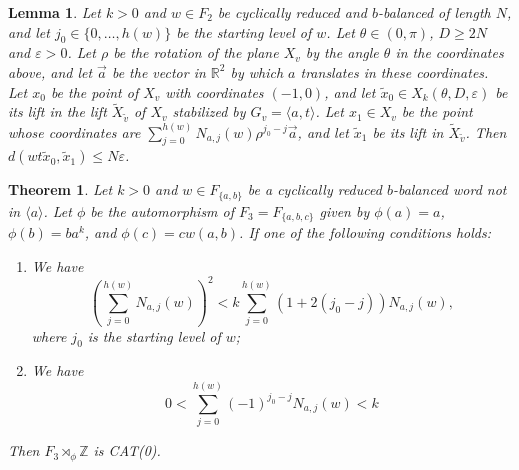 \documentclass[10pt,a4paper]{amsart}
\newtheorem{lem}{Lemma}
\newtheorem{thm}{Theorem}
\newcommand{\R}{\mathbb{R}}
\newcommand{\Z}{\mathbb{Z}}
\newcommand{\eps}{\varepsilon}
\begin{document}
\begin{lem}
\label{FlatkPos}
    Let $k > 0$ and $w\in F_2$ be cyclically reduced and $b$-balanced of length $N$, and let $j_0\in \{0, \ldots, h(w)\}$ be the starting level of $w$. Let $\theta\in (0, \pi)$, $D \ge 2N$ and $\eps > 0$. Let $\rho$ be the rotation of the plane $X_v$ by the angle $\theta$ in the coordinates above, and let $\vec{a}$ be the vector in $\R^2$ by which $a$ translates in these coordinates. Let $x_0$ be the point of $X_v$ with coordinates $(-1, 0)$, and let $\tilde{x}_0\in X_k(\theta, D, \eps)$ be its lift in the lift $\tilde{X}_{\tilde{v}}$ of $X_v$ stabilized by $G_v = \langle a, t\rangle$. Let $x_1\in X_v$ be the point whose coordinates are $\displaystyle \sum_{j=0}^{h(w)} N_{a,j}(w)\rho^{j_0-j}\vec{a}$, and let $\tilde{x}_1$ be its lift in $\tilde{X}_{\tilde{v}}$. Then $d(wt\tilde{x}_0, \tilde{x}_1) \le N\eps$.
\end{lem}

\begin{thm}
\label{CAT0ex}
    Let $k > 0$ and $w\in F_{\{a, b\}}$ be a cyclically reduced $b$-balanced word not in $\langle a\rangle$. Let $\phi$ be the automorphism of $F_3=F_{\{a,b,c\}}$ given by $\phi(a)=a$, $\phi(b)=ba^k$, and $\phi(c) = cw(a,b)$. If one of the following conditions holds:
    \begin{enumerate}
        \item We have
        \[\left(\sum_{j=0}^{h(w)} N_{a,j}(w)\right)^2 < k\sum_{j=0}^{h(w)} (1 + 2(j_0-j))N_{a,j}(w),\]
        where $j_0$ is the starting level of $w$;
        \item We have
        \[0 < \sum_{j=0}^{h(w)} (-1)^{j_0-j}N_{a,j}(w) < k\]
    \end{enumerate}
    Then $F_3\rtimes_\phi\Z$ is CAT(0).
\end{thm}
\end{document}
